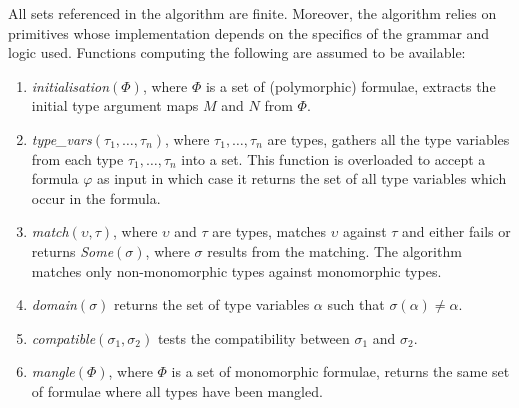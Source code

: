 \documentclass[runningheads]{llncs}
\begin{document}
All sets referenced in the algorithm are %
finite. Moreover, the algorithm relies on primitives whose implementation depends on the specifics of the grammar and logic used. %
Functions computing the following are assumed to be available: 
\begin{enumerate}
   \item[\labelitemi] \emph{initialisation\((\Phi)\)}, where \(\Phi\) is a set of (polymorphic) formulae, extracts the initial type argument maps \(M\) and \(N\) from \(\Phi\).
   \item[\labelitemi] \emph{type\_vars\((\tau_1, \dots, \tau_n)\)}, where \(\tau_1, \dots,\tau_n\) are types, gathers all the type variables from each type \(\tau_1, \dots, \tau_n\) into a set. This function is overloaded to accept a formula \(\varphi\) as input in which case it returns the set of all type variables which occur in the formula.
   \item[\labelitemi] \emph{match\((\upsilon, \tau)\)}, where \(\upsilon\) and \(\tau\) are types, matches \(\upsilon\) against \(\tau\) and either fails or returns \emph{Some\((\sigma)\)}, where \(\sigma\) results from the matching. The algorithm matches only non-monomorphic types against monomorphic types.
   \item[\labelitemi] \emph{domain\((\sigma)\)} %
   returns the set of type variables \(\alpha\) such that \(\sigma(
   \alpha) \not= \alpha\).
   \item[\labelitemi] \emph{compatible\((\sigma_1, \sigma_2)\)} %
   tests the compatibility between \(\sigma_1\) and \(\sigma_2\).
   \item[\labelitemi] \emph{mangle\((\Phi)\)}, where \(\Phi\) is a set of monomorphic formulae, returns the same set of formulae where all types have been mangled.
\end{enumerate}
\end{document}
